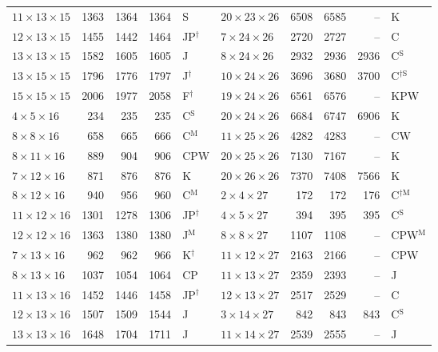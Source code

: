 \begin{longtable}{@{}lrrrl@{\hspace{6mm}}lrrrl@{}}
$11{\times}13{\times}15$ & 1363 & 1364 & 1364 & S & $20{\times}23{\times}26$ & 6508 & 6585 & -- & K\\
$12{\times}13{\times}15$ & 1455 & 1442 & 1464 & JP$^{\dagger}$ & $7{\times}24{\times}26$ & 2720 & 2727 & -- & C\\
$13{\times}13{\times}15$ & 1582 & 1605 & 1605 & J & $8{\times}24{\times}26$ & 2932 & 2936 & 2936 & C$^{\mathrm{S}}$\\
$13{\times}15{\times}15$ & 1796 & 1776 & 1797 & J$^{\dagger}$ & $10{\times}24{\times}26$ & 3696 & 3680 & 3700 & C$^{\dagger\mathrm{S}}$\\
$15{\times}15{\times}15$ & 2006 & 1977 & 2058 & F$^{\dagger}$ & $19{\times}24{\times}26$ & 6561 & 6576 & -- & KPW\\
$4{\times}5{\times}16$ & 234 & 235 & 235 & C$^{\mathrm{S}}$ & $20{\times}24{\times}26$ & 6684 & 6747 & 6906 & K\\
$8{\times}8{\times}16$ & 658 & 665 & 666 & C$^{\mathrm{M}}$ & $11{\times}25{\times}26$ & 4282 & 4283 & -- & CW\\
$8{\times}11{\times}16$ & 889 & 904 & 906 & CPW & $20{\times}25{\times}26$ & 7130 & 7167 & -- & K\\
$7{\times}12{\times}16$ & 871 & 876 & 876 & K & $20{\times}26{\times}26$ & 7370 & 7408 & 7566 & K\\
$8{\times}12{\times}16$ & 940 & 956 & 960 & C$^{\mathrm{M}}$ & $2{\times}4{\times}27$ & 172 & 172 & 176 & C$^{\dagger\mathrm{M}}$\\
$11{\times}12{\times}16$ & 1301 & 1278 & 1306 & JP$^{\dagger}$ & $4{\times}5{\times}27$ & 394 & 395 & 395 & C$^{\mathrm{S}}$\\
$12{\times}12{\times}16$ & 1363 & 1380 & 1380 & J$^{\mathrm{M}}$ & $8{\times}8{\times}27$ & 1107 & 1108 & -- & CPW$^{\mathrm{M}}$\\
$7{\times}13{\times}16$ & 962 & 962 & 966 & K$^{\dagger}$ & $11{\times}12{\times}27$ & 2163 & 2166 & -- & CPW\\
$8{\times}13{\times}16$ & 1037 & 1054 & 1064 & CP & $11{\times}13{\times}27$ & 2359 & 2393 & -- & J\\
$11{\times}13{\times}16$ & 1452 & 1446 & 1458 & JP$^{\dagger}$ & $12{\times}13{\times}27$ & 2517 & 2529 & -- & C\\
$12{\times}13{\times}16$ & 1507 & 1509 & 1544 & J & $3{\times}14{\times}27$ & 842 & 843 & 843 & C$^{\mathrm{S}}$\\
$13{\times}13{\times}16$ & 1648 & 1704 & 1711 & J & $11{\times}14{\times}27$ & 2539 & 2555 & -- & J\\

\end{longtable}
